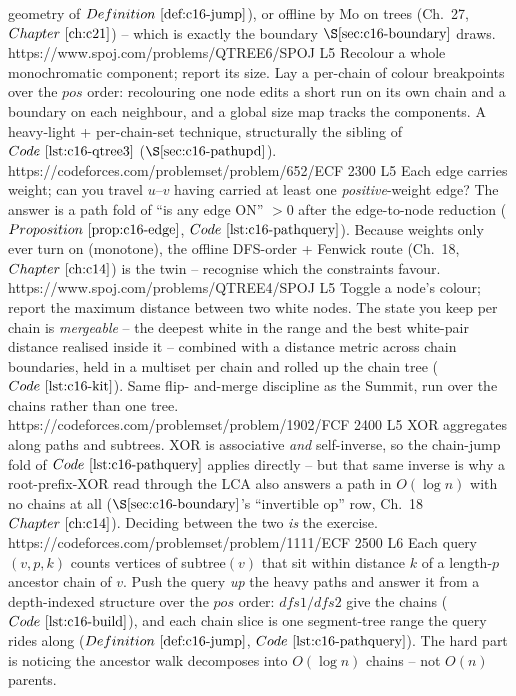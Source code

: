 \begin{mixedset}
{     geometry of \(\defref{c16-jump}\)), or offline by Mo on trees (Ch.~27, \(\chref{c21}\)) --
     which is exactly the boundary \(\secref{c16-boundary}\) draws.}
    {https://www.spoj.com/problems/QTREE6/}{SPOJ L5}
    {Recolour a whole monochromatic component; report its size. Lay a per-chain  of
     colour breakpoints over the \(\mathit{pos}\) order: recolouring one node edits a short run on
     its own chain and a boundary on each neighbour, and a global size map tracks the components.
     A heavy-light + per-chain-set technique, structurally the sibling of
     \(\coderef{c16-qtree3}\) (\(\secref{c16-pathupd}\)).}
    {https://codeforces.com/problemset/problem/652/E}{CF 2300 L5}
    {Each edge carries weight; can you travel \(u\)--\(v\) having carried at least one
     \emph{positive}-weight edge? The answer is a path fold of ``is any edge ON'' \(>0\) after the
     edge-to-node reduction (\(\propref{c16-edge}\), \(\coderef{c16-pathquery}\)). Because weights
     only ever turn on (monotone), the offline DFS-order + Fenwick route (Ch.~18,
     \(\chref{c14}\)) is the twin -- recognise which the constraints favour.}
    {https://www.spoj.com/problems/QTREE4/}{SPOJ L5}
    {Toggle a node's colour; report the maximum distance between two white nodes. The state you
     keep per chain is \emph{mergeable} -- the deepest white in the range and the best white-pair
     distance realised inside it -- combined with a distance metric across chain boundaries, held
     in a multiset per chain and rolled up the chain tree (\(\coderef{c16-kit}\)). Same flip-
     and-merge discipline as the Summit, run over the chains rather than one tree.}
    {https://codeforces.com/problemset/problem/1902/F}{CF 2400 L5}
    {XOR aggregates along paths and subtrees. XOR is associative \emph{and} self-inverse, so the
     chain-jump fold of \(\coderef{c16-pathquery}\) applies directly -- but that same inverse is
     why a root-prefix-XOR read through the LCA also answers a path in \(O(\log n)\) with no
     chains at all (\(\secref{c16-boundary}\)'s ``invertible op'' row, Ch.~18 \(\chref{c14}\)).
     Deciding between the two \emph{is} the exercise.}
    {https://codeforces.com/problemset/problem/1111/E}{CF 2500 L6}
    {Each query \((v,p,k)\) counts vertices of subtree\((v)\) that sit within distance \(k\) of a
     length-\(p\) ancestor chain of \(v\). Push the query \emph{up} the heavy paths and answer it
     from a depth-indexed structure over the \(\mathit{pos}\) order: \(\mathit{dfs1}/\mathit{dfs2}\)
     give the chains (\(\coderef{c16-build}\)), and each chain slice is one segment-tree range the
     query rides along (\(\defref{c16-jump}\), \(\coderef{c16-pathquery}\)). The hard part is
     noticing the ancestor walk decomposes into \(O(\log n)\) chains -- not \(O(n)\) parents.}
\end{mixedset}


